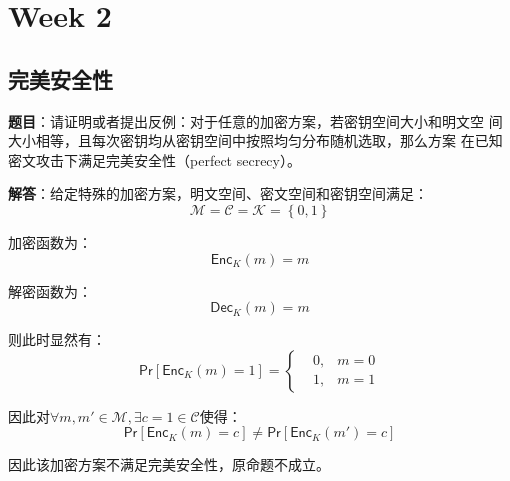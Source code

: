 \chapter{Week 2}

\section{完美安全性}

\textbf{题目}：请证明或者提出反例：对于任意的加密方案，若密钥空间大小和明文空
间大小相等，且每次密钥均从密钥空间中按照均匀分布随机选取，那么方案
在已知密文攻击下满足完美安全性（perfect secrecy）。

\textbf{解答}：给定特殊的加密方案，明文空间、密文空间和密钥空间满足：
\begin{equation}
    \mathcal{M}=\mathcal{C}=\mathcal{K}=\left\{0, 1\right\}
\end{equation}

加密函数为：
\begin{equation}
    \mathsf{Enc}_K(m) = m
\end{equation}

解密函数为：
\begin{equation}
    \mathsf{Dec}_K(m) = m
\end{equation}

则此时显然有：
\begin{equation}
    \mathsf{Pr}\left[\mathsf{Enc}_K(m) = 1\right] = \left\{
        \begin{aligned}
            &0, & m = 0\\
            &1, & m = 1
        \end{aligned}
    \right.
\end{equation}

因此对$\forall m, m' \in \mathcal{M}, \exists c = 1 \in \mathcal{C}$使得：
\begin{equation}
    \mathsf{Pr}\left[\mathsf{Enc}_K(m) = c\right] \neq \mathsf{Pr}\left[\mathsf{Enc}_K(m') = c\right]
\end{equation}

因此该加密方案不满足完美安全性，原命题不成立。